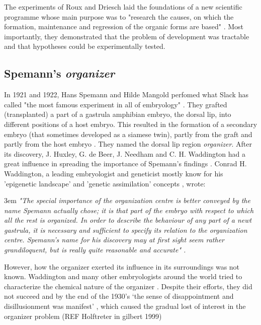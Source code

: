 The experiments of Roux and Driesch laid the foundations of a new scientific programme whose main purpose was to "research the causes, on which the formation, maintenance and regression of the organic forms are based" \citep{Roux1897}. 
Most importantly, they demonstrated that the problem of development was tractable and that hypotheses could be experimentally tested.

\subsection{Spemann's \textit{organizer}}

In 1921 and 1922, Hans Spemann and Hilde Mangold perfomed what Slack has called "the most famous experiment in all of embryology" \citep{slack2012egg}.
They grafted (transplanted) a part of a gastrula amphibian embryo, the dorsal lip, into different positions of a host embryo. This resulted in the formation of a secondary embryo (that sometimes developed as a siamese twin), partly from the graft and partly from the host embryo \citep{Spemann1924}. They named the dorsal lip region \textit{organizer}.
After its discovery, J. Huxley, G. de Beer, J. Needham and C. H. Waddington had a great influence in spreading the importance of Spemann's findings \citep{Horder2001}. Conrad H. Waddington, a leading embryologist and geneticist mostly know for his 'epigenetic landscape' and 'genetic assimilation' concepts \citep{Slack2002}, wrote:
\begin{flushleft}
\leftskip3em
\rightskip\leftskip
\footnotesize{
\textit{"The special importance of the organization centre is better conveyed by the name Spemann actually chose; it is that part of the embryo with respect to which all the rest is organized. In order to describe the behaviour of any part of a newt gastrula, it is necessary and sufficient to specify its relation to the organization centre. Spemann's name for his discovery may at first sight seem rather grandiloquent, but is really quite reasonable and accurate" \citep{Waddington1962}.} }
\end{flushleft}
However, how the organizer exerted its influence in its surroundings was not known. 
Waddington and many other embryologists around the world tried to characterize the chemical nature of the organizer \citep{Waddington1935,gilbert1991conceptual}.
Despite their efforts, they did not succeed and by the end of the 1930's `the sense of disappointment and disillusionment was manifest' \citep{Horder2010}, which caused the gradual lost of interest in the organizer problem (REF Holftreter in gilbert 1999) 



